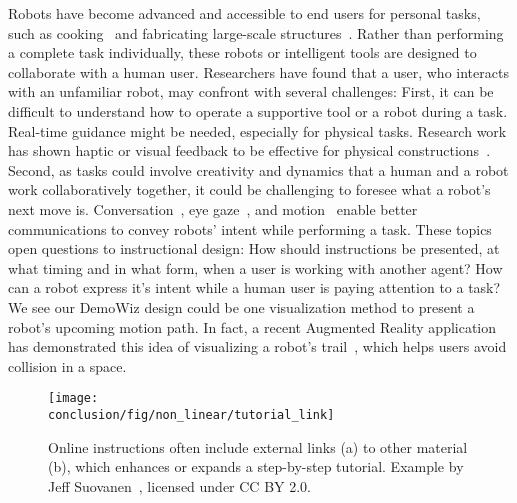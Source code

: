 Robots have become advanced and accessible to end users for personal tasks, such as cooking~\cite{Cha:2015:RHQ:2696454.2696465} and fabricating large-scale structures~\cite{Vasey:2016:HHR:2897839.2927404}. Rather than performing a complete task individually, these robots or intelligent tools are designed to collaborate with a human user. Researchers have found that a user, who interacts with an unfamiliar robot, may confront with several challenges:
%
First, it can be difficult to understand how to operate a supportive tool or a robot during a task. Real-time guidance might be needed, especially for physical tasks. Research work has shown haptic or visual feedback to be effective for physical constructions~\cite{Agrawal:2015:PPS:2807442.2807505,Zoran:2013:FFD:2470654.2481361,Schoop:2016:DSS:2851581.2892429}.
%
Second, as tasks could involve creativity and dynamics that a human and a robot work collaboratively together, it could be challenging to foresee what a robot's next move is. Conversation~\cite{ChaoSimonSays11}, eye gaze~\cite{Andrist:2014:CGA:2559636.2559666}, and motion~\cite{Dragan:2015:ERM:2696454.2696473,Szafir:2014:CIA:2559636.2559672} enable better communications to convey robots' intent while performing a task.
%
These topics open questions to instructional design:
How should instructions be presented, at what timing and in what form, when a user is working with another agent? How can a robot express it's intent while a human user is paying attention to a task?
%
We see our DemoWiz design could be one visualization method to present a robot's upcoming motion path. In fact, a recent Augmented Reality application has demonstrated this idea of visualizing a robot's trail~\cite{HoloLensRobot}, which helps users avoid collision in a space.

\begin{figure*}[h!]
  \centering
  \texttt{[image: \\conclusion/fig/non\_linear/tutorial\_link]}
  \caption{
    Online instructions often include external links (a) to other material (b), which enhances or expands a step-by-step tutorial. Example by Jeff Suovanen~\cite{iPhoneRepairExample}, licensed under CC BY 2.0.
  }
  \label{fig:discussion_nonlinear}
\end{figure*}

